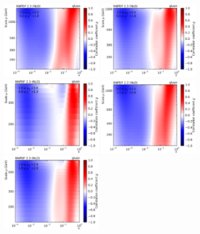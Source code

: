 \begin{figure}[htbp]
    \centering
    \includegraphics[width=0.45\textwidth]{figures/pdf_constraints/corr_PTMAXEXPYS_YBYS_NLO_FINALBINS_NNPDF23_gluon_ys0_0yb0_0_cl.pdf}\hfill
    \includegraphics[width=0.45\textwidth]{figures/pdf_constraints/corr_PTMAXEXPYS_YBYS_NLO_FINALBINS_NNPDF23_gluon_ys0_0yb1_0_cl.pdf}\hfill
    \includegraphics[width=0.45\textwidth]{figures/pdf_constraints/corr_PTMAXEXPYS_YBYS_NLO_FINALBINS_NNPDF23_gluon_ys0_0yb2_0_cl.pdf}\hfill
    \includegraphics[width=0.45\textwidth]{figures/pdf_constraints/corr_PTMAXEXPYS_YBYS_NLO_FINALBINS_NNPDF23_gluon_ys1_0yb0_0_cl.pdf}\hfill
    \includegraphics[width=0.45\textwidth]{figures/pdf_constraints/corr_PTMAXEXPYS_YBYS_NLO_FINALBINS_NNPDF23_gluon_ys1_0yb1_0_cl.pdf}\hfill

\end{figure}

